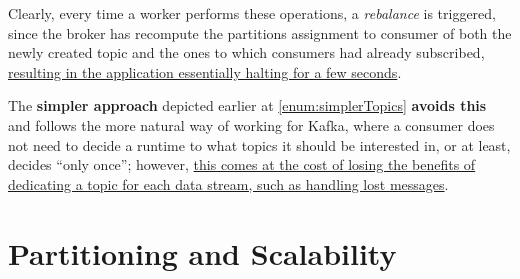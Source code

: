 Clearly, every time a worker performs these operations, a \textit{rebalance} is triggered, since the broker has recompute the partitions assignment to consumer of both the newly created topic  and the ones to which consumers had already subscribed,
\ul{resulting in the application essentially halting for a few seconds}.

The \textbf{simpler approach} depicted earlier at \ref{enum:simplerTopics} \textbf{avoids this} and follows the more natural way of working for Kafka, where a consumer does not need to decide a runtime to what topics it should be interested in, or at least, decides ``only once'';
however, \ul{this comes at the cost of losing the benefits of dedicating a topic for each data stream, such as handling lost messages}.




\newpage
\section{Partitioning and Scalability}
